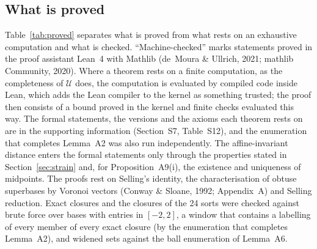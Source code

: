 \subsection{What is proved}
\label{sec:verification}
Table~\ref{tab:proved} separates what is proved from what rests on an exhaustive computation and what is checked. ``Machine-checked'' marks statements proved in the proof assistant Lean~4 with Mathlib (de~Moura \& Ullrich, 2021; mathlib Community, 2020). Where a theorem rests on a finite computation, as the completeness of $\mathcal U$ does, the computation is evaluated by compiled code inside Lean, which adds the Lean compiler to the kernel as something trusted; the proof then consists of a bound proved in the kernel and finite checks evaluated this way. The formal statements, the versions and the axioms each theorem rests on are in the supporting information (Section~S7, Table~S12), and the enumeration that completes Lemma~A2 was also run independently. The affine-invariant distance enters the formal statements only through the properties stated in Section~\ref{sec:strain} and, for Proposition~A9(i), the existence and uniqueness of midpoints. The proofs rest on Selling's identity, the characterisation of obtuse superbases by Voronoi vectors (Conway \& Sloane, 1992; Appendix~A) and Selling reduction. Exact closures and the closures of the 24 sorts were checked against brute force over bases with entries in $[-2,2]$, a window that contains a labelling of every member of every exact closure (by the enumeration that completes Lemma~A2), and widened sets against the ball enumeration of Lemma~A6.

